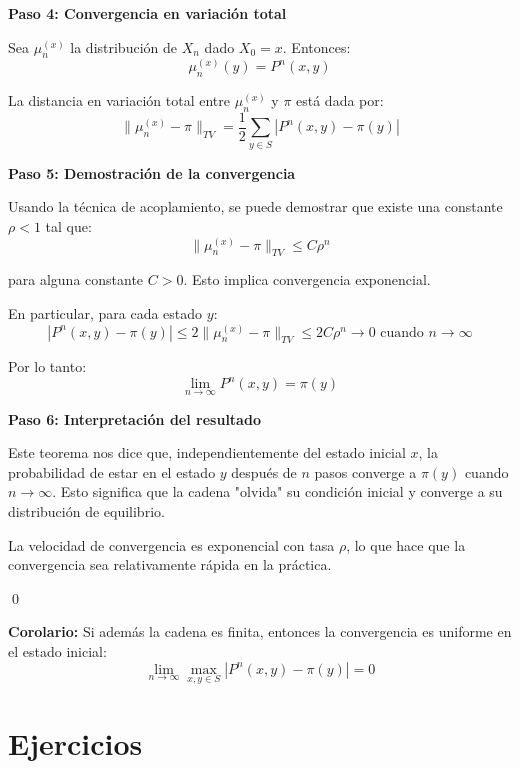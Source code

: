 \documentclass[12pt,a4paper]{article}
\begin{document}
\textbf{Paso 4: Convergencia en variación total}

Sea $\mu_n^{(x)}$ la distribución de $X_n$ dado $X_0 = x$. Entonces:
\begin{equation*}
\mu_n^{(x)}(y) = P^n(x,y)
\end{equation*}

La distancia en variación total entre $\mu_n^{(x)}$ y $\pi$ está dada por:
\begin{equation*}
\|\mu_n^{(x)} - \pi\|_{TV} = \frac{1}{2}\sum_{y \in S} |P^n(x,y) - \pi(y)|
\end{equation*}

\textbf{Paso 5: Demostración de la convergencia}

Usando la técnica de acoplamiento, se puede demostrar que existe una constante $\rho < 1$ tal que:
\begin{equation*}
\|\mu_n^{(x)} - \pi\|_{TV} \leq C \rho^n
\end{equation*}

para alguna constante $C > 0$. Esto implica convergencia exponencial.

En particular, para cada estado $y$:
\begin{equation*}
|P^n(x,y) - \pi(y)| \leq 2\|\mu_n^{(x)} - \pi\|_{TV} \leq 2C \rho^n \to 0 \text{ cuando } n \to \infty
\end{equation*}

Por lo tanto:
\begin{equation*}
\lim_{n \to \infty} P^n(x,y) = \pi(y)
\end{equation*}

\textbf{Paso 6: Interpretación del resultado}

Este teorema nos dice que, independientemente del estado inicial $x$, la probabilidad de estar en el estado $y$ después de $n$ pasos converge a $\pi(y)$ cuando $n \to \infty$. Esto significa que la cadena "olvida" su condición inicial y converge a su distribución de equilibrio.

La velocidad de convergencia es exponencial con tasa $\rho$, lo que hace que la convergencia sea relativamente rápida en la práctica.

\qed

\textbf{Corolario:} Si además la cadena es finita, entonces la convergencia es uniforme en el estado inicial:
\begin{equation*}
\lim_{n \to \infty} \max_{x,y \in S} |P^n(x,y) - \pi(y)| = 0
\end{equation*}

\section{Ejercicios}
\end{document}
